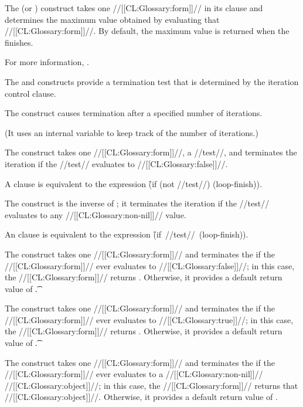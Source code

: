 The  (or ) construct
takes one //[[CL:Glossary:form]]// in its clause 
and determines the maximum value obtained by evaluating that //[[CL:Glossary:form]]//.
By default, the maximum value is returned when the  finishes.

For more information, \seesection\LOOPValAcc.

\endsubsubsubsection%

 
The  and  constructs provide a termination test
that is determined by the iteration control clause.
 
The  construct causes termination after a specified
number of iterations.

(It uses an internal variable to keep track of the number of iterations.)
 
The  construct takes one //[[CL:Glossary:form]]//, a //test//, 
and terminates the iteration if the //test// evaluates to //[[CL:Glossary:false]]//.

A  clause is equivalent to the expression 
\f{(if (not //test//) (loop-finish))}.
 
The  construct is the inverse of ;
it terminates the iteration if the //test// evaluates to
any //[[CL:Glossary:non-nil]]// value.

An  clause is equivalent to the expression
\hbox{\f{(if //test// (loop-finish))}}.
 
The  construct takes one //[[CL:Glossary:form]]// and
terminates the  if the //[[CL:Glossary:form]]// ever evaluates to //[[CL:Glossary:false]]//;
in this case, the  //[[CL:Glossary:form]]// returns \nil.
Otherwise, it provides a default return value of \t.
 
The  construct takes one //[[CL:Glossary:form]]// and
terminates the  if the //[[CL:Glossary:form]]// ever evaluates to //[[CL:Glossary:true]]//;
in this case, the  //[[CL:Glossary:form]]// returns \nil.
Otherwise, it provides a default return value of \t.
 
The  construct takes one //[[CL:Glossary:form]]// and
terminates the  if the //[[CL:Glossary:form]]// ever evaluates to
a //[[CL:Glossary:non-nil]]// //[[CL:Glossary:object]]//;
in this case, the  //[[CL:Glossary:form]]// returns that //[[CL:Glossary:object]]//.
Otherwise, it provides a default return value of \nil.



